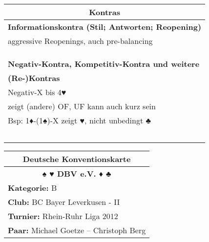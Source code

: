 \documentclass{article}
\begin{document}
\begin{multicols}{3}
\begin{tabularx}{\columnwidth}{|X|}
\multicolumn{1}{c}{\bf \large Kontras} \\
\hline {\bf Informationskontra (Stil; Antworten; Reopening)} \\
       {aggressive Reopenings, auch pre-balancing} \\
       {} \\
       {} \\
       {} \\
\hline {\bf Negativ-Kontra, Kompetitiv-Kontra und weitere} \\
       {\bf (Re-)Kontras} \\
       {Negativ-X bis 4♥} \\
       {zeigt (andere) OF, UF kann auch kurz sein} \\
       {Bsp: 1♦-(1♠)-X zeigt ♥, nicht unbedingt ♣} \\
       {} \\
       {} \\
       {} \\
       {} \\
       {} \\
\hline \end{tabularx}

\begin{tabularx}{\columnwidth}{|X|}
\hline \multicolumn{1}{c}{\bf \Large Deutsche Konventionskarte} \\
\hline \multicolumn{1}{c}{\bf \Large ♠ ♥ DBV e.V. ♦ ♣} \\
\hline {\bf Kategorie:} B \\
\hline {\bf Club:} BC Bayer Leverkusen - II \\
\hline {\bf Turnier:} Rhein-Ruhr Liga 2012 \\
\hline {\bf Paar:} Michael Goetze -- Christoph Berg \\


\end{tabularx}
\end{multicols}
\end{document}
